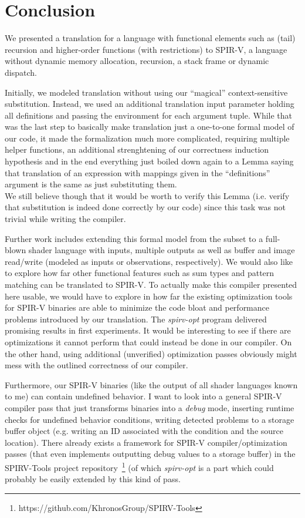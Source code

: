 \documentclass[letterpaper,12pt]{article}
\begin{document}
\section{Conclusion}

We presented a translation for a language with functional elements
such as (tail) recursion and higher-order functions (with restrictions)
to SPIR-V, a language without dynamic memory allocation, recursion,
a stack frame or dynamic dispatch.

Initially, we modeled translation without using our ``magical'' 
context-sensitive substitution. Instead, we used an additional
translation input parameter holding all definitions and passing
the environment for each argument tuple. While that was the last step to basically
make translation just a one-to-one formal model of our code, it made
the formalization much more complicated, requiring multiple helper functions,
an additional strenghtening of our correctness induction hypothesis
and in the end everything just boiled down again to a Lemma saying that
translation of an expression with mappings given in the ``definitions''
argument is the same as just substituting them. \\
We still believe though that it would be worth to verify this
Lemma (i.e. verify that substitution is indeed done correctly by our code)
since this task was not trivial while writing the compiler.

Further work includes extending this formal model from the subset
to a full-blown shader language with inputs, multiple outputs as
well as buffer and image read/write (modeled as inputs or observations,
respectively). We would also like to explore how far other functional
features such as sum types and pattern matching can be translated
to SPIR-V. To actually make this compiler presented here usable,
we would have to explore in how far the existing optimization tools
for SPIR-V binaries are able to minimize the code bloat and performance
problems introduced by our translation.
The \textit{spirv-opt} program delivered promising results in first experiments.
It would be interesting to see if there are optimizations it cannot perform
that could instead be done in our compiler. On the other hand, using additional
(unverified) optimization passes obviously might mess with the outlined correctness
of our compiler.

Furthermore, our SPIR-V binaries (like the output of all shader languages
known to me) can contain undefined behavior. I want to look
into a general SPIR-V compiler pass that just transforms binaries
into a \textit{debug} mode, inserting runtime checks for
undefined behavior conditions, writing
detected problems to a storage buffer object (e.g. writing
an ID associated with the condition and the source location).
There already exists a framework for SPIR-V compiler/optimization passes (that even
implements outputting debug values to a storage buffer) in the SPIRV-Tools 
project repository~\footnote{https://github.com/KhronosGroup/SPIRV-Tools} (of
which \textit{spirv-opt} is a part which could probably be easily extended 
by this kind of pass.
\end{document}
